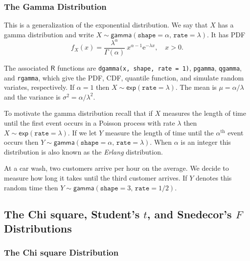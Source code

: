 \documentclass[captions=tableheading]{scrbook}
\begin{document}
\subsubsection{The Gamma Distribution}
\label{sec-6-5-1-2}
\label{sub-The-Gamma-Distribution}


This is a generalization of the exponential distribution. We say that \(X\) has a gamma distribution and write \(X\sim\mathsf{gamma}(\mathtt{shape}=\alpha,\,\mathtt{rate}=\lambda)\). It has PDF
\begin{equation}
f_{X}(x)=\frac{\lambda^{\alpha}}{\Gamma(\alpha)}\: x^{\alpha-1}\mathrm{e}^{-\lambda x},\quad x>0.
\end{equation}

The associated \(\mathsf{R}\) functions are \texttt{dgamma(x, shape, rate = 1)}, \texttt{pgamma}, \texttt{qgamma}, and \texttt{rgamma}, which give the PDF, CDF, quantile function, and simulate random variates, respectively. If \(\alpha=1\) then \(X\sim\mathsf{exp}(\mathtt{rate}=\lambda)\). The mean is \(\mu=\alpha/\lambda\) and the variance is \(\sigma^{2}=\alpha/\lambda^{2}\).

To motivate the gamma distribution recall that if \(X\) measures the length of time until the first event occurs in a Poisson process with rate \(\lambda\) then \(X\sim\mathsf{exp}(\mathtt{rate}=\lambda)\). If we let \(Y\) measure the length of time until the \(\alpha^{\mathrm{th}}\) event occurs then \(Y\sim\mathsf{gamma}(\mathtt{shape}=\alpha,\,\mathtt{rate}=\lambda)\). When \(\alpha\) is an integer this distribution is also known as the \emph{Erlang} distribution.

\begin{example}
At a car wash, two customers arrive per hour on the average. We decide to measure how long it takes until the third customer arrives. If \(Y\) denotes this random time then \(Y\sim\mathsf{gamma}(\mathtt{shape}=3,\,\mathtt{rate}=1/2)\).
\end{example}
\subsection{The Chi square, Student's \(t\), and Snedecor's \(F\) Distributions}
\label{sec-6-5-2}
\label{sub-The-Chi-Square-t-F}
\subsubsection{The Chi square Distribution}
\label{sec-6-5-2-1}
\label{sub-The-Chi-Square}
\end{document}
